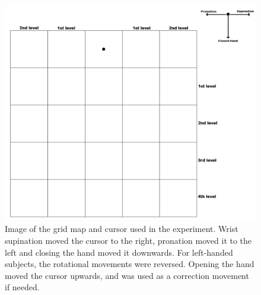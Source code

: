 \begin{figure}[H]                 
	\includegraphics[width=1\textwidth]{figures/gridmap2}  
	\caption{Image of the grid map and cursor used in the experiment. Wrist supination moved the cursor to the right, pronation moved it to the left and closing the hand moved it downwards. For left-handed subjects, the rotational movements were reversed. Opening the hand moved the cursor upwards, and was used as a correction movement if needed.}
	\label{fig:pa:gridmap} 
\end{figure}